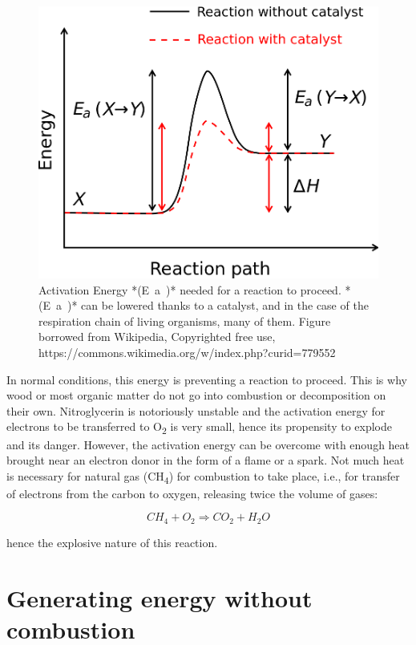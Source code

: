 \documentclass[]{book}
\theoremstyle{definition}
\theoremstyle{definition}
\theoremstyle{definition}
\theoremstyle{remark}
\begin{document}
\begin{figure}

{\centering \includegraphics[width=0.7\linewidth]{pictures/Activation_energy} 

}

\caption{Activation Energy *(E~a~)* needed for a reaction to proceed. *(E~a~)* can be lowered thanks to a catalyst, and in the case of the respiration chain of living organisms, many of them. Figure borrowed from Wikipedia, Copyrighted free use, https://commons.wikimedia.org/w/index.php?curid=779552}\label{fig:EnergyActivation}
\end{figure}

In normal conditions, this energy is preventing a reaction to proceed.
This is why wood or most organic matter do not go into combustion or
decomposition on their own. Nitroglycerin is notoriously unstable and
the activation energy for electrons to be transferred to
O\textsubscript{2} is very small, hence its propensity to explode and
its danger. However, the activation energy can be overcome with enough
heat brought near an electron donor in the form of a flame or a spark.
Not much heat is necessary for natural gas (CH\textsubscript{4}) for
combustion to take place, i.e., for transfer of electrons from the
carbon to oxygen, releasing twice the volume of gases:

\begin{equation}
CH_4 + O_2 \Rightarrow CO_2 + H_2O
\label{eq:CH4combustion}
\end{equation}

hence the explosive nature of this reaction.

\section{Generating energy without
combustion}\label{generating-energy-without-combustion}
\end{document}
